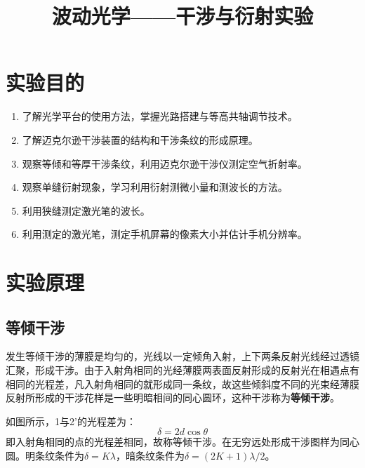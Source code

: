 \documentclass[UTF8]{article}
\title{波动光学——干涉与衍射实验}
\author{} %
\date{} %
\begin{document}
\maketitle

\section{实验目的}

\begin{enumerate}
    \item 了解光学平台的使用方法，掌握光路搭建与等高共轴调节技术。
    \item 了解迈克尔逊干涉装置的结构和干涉条纹的形成原理。
    \item 观察等倾和等厚干涉条纹，利用迈克尔逊干涉仪测定空气折射率。
    \item 观察单缝衍射现象，学习利用衍射测微小量和测波长的方法。
    \item 利用狭缝测定激光笔的波长。
    \item 利用测定的激光笔，测定手机屏幕的像素大小并估计手机分辨率。
\end{enumerate}

\section{实验原理}

\subsection{等倾干涉}

发生等倾干涉的薄膜是均匀的，光线以一定倾角入射，上下两条反射光线经过透镜汇聚，形成干涉。由于入射角相同的光经薄膜两表面反射形成的反射光在相遇点有相同的光程差，凡入射角相同的就形成同一条纹，故这些倾斜度不同的光束经薄膜反射所形成的干涉花样是一些明暗相间的同心圆环，这种干涉称为\textbf{等倾干涉}。

如图所示，1与2'的光程差为：
\begin{equation}
    \delta = 2d\cos\theta
    \label{eq:equal-incline}
\end{equation}
即入射角相同的点的光程差相同，故称等倾干涉。在无穷远处形成干涉图样为同心圆。明条纹条件为$\delta = K\lambda$，暗条纹条件为$\delta = (2K+1)\lambda/2$。
\end{document}
